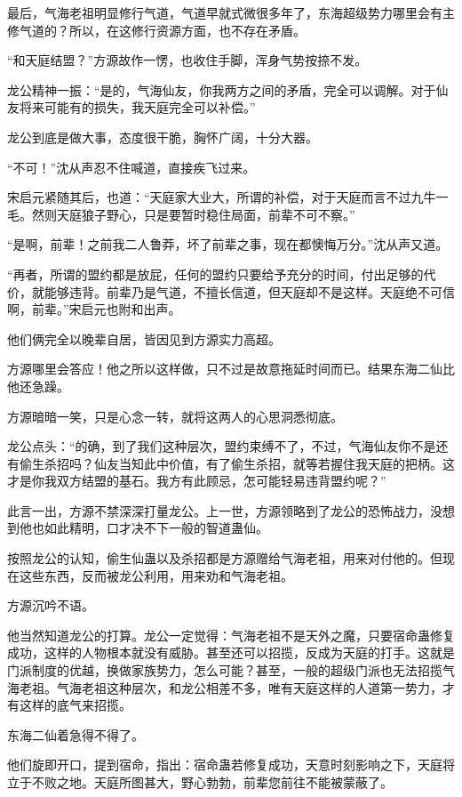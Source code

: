 \begin{this_body}
最后，气海老祖明显修行气道，气道早就式微很多年了，东海超级势力哪里会有主修气道的？所以，在这修行资源方面，也不存在矛盾。

“和天庭结盟？”方源故作一愣，也收住手脚，浑身气势按捺不发。

龙公精神一振：“是的，气海仙友，你我两方之间的矛盾，完全可以调解。对于仙友将来可能有的损失，我天庭完全可以补偿。”

龙公到底是做大事，态度很干脆，胸怀广阔，十分大器。

“不可！”沈从声忍不住喊道，直接疾飞过来。

宋启元紧随其后，也道：“天庭家大业大，所谓的补偿，对于天庭而言不过九牛一毛。然则天庭狼子野心，只是要暂时稳住局面，前辈不可不察。”

“是啊，前辈！之前我二人鲁莽，坏了前辈之事，现在都懊悔万分。”沈从声又道。

“再者，所谓的盟约都是放屁，任何的盟约只要给予充分的时间，付出足够的代价，就能够违背。前辈乃是气道，不擅长信道，但天庭却不是这样。天庭绝不可信啊，前辈。”宋启元也附和出声。

他们俩完全以晚辈自居，皆因见到方源实力高超。

方源哪里会答应！他之所以这样做，只不过是故意拖延时间而已。结果东海二仙比他还急躁。

方源暗暗一笑，只是心念一转，就将这两人的心思洞悉彻底。

龙公点头：“的确，到了我们这种层次，盟约束缚不了，不过，气海仙友你不是还有偷生杀招吗？仙友当知此中价值，有了偷生杀招，就等若握住我天庭的把柄。这才是你我双方结盟的基石。我方有此顾忌，怎可能轻易违背盟约呢？”

此言一出，方源不禁深深打量龙公。上一世，方源领略到了龙公的恐怖战力，没想到他也如此精明，口才决不下一般的智道蛊仙。

按照龙公的认知，偷生仙蛊以及杀招都是方源赠给气海老祖，用来对付他的。但现在这些东西，反而被龙公利用，用来劝和气海老祖。

方源沉吟不语。

他当然知道龙公的打算。龙公一定觉得：气海老祖不是天外之魔，只要宿命蛊修复成功，这样的人物根本就没有威胁。甚至还可以招揽，反成为天庭的打手。这就是门派制度的优越，换做家族势力，怎么可能？甚至，一般的超级门派也无法招揽气海老祖。气海老祖这种层次，和龙公相差不多，唯有天庭这样的人道第一势力，才有这样的底气来招揽。

东海二仙着急得不得了。

他们旋即开口，提到宿命，指出：宿命蛊若修复成功，天意时刻影响之下，天庭将立于不败之地。天庭所图甚大，野心勃勃，前辈您前往不能被蒙蔽了。


\end{this_body}
